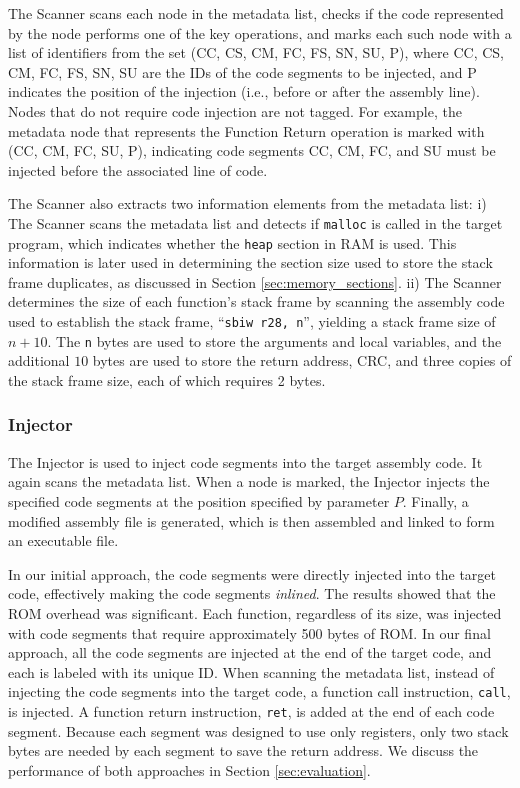 The Scanner scans each node in the metadata list, checks if the code represented by the node performs one of the key operations, and marks each such node with a list of identifiers from the set (CC, CS, CM, FC, FS, SN, SU, P), where CC, CS, CM, FC, FS, SN, SU are the IDs of the code segments to be injected, and P indicates the position of the injection (i.e., before or after the assembly line). Nodes that do not require code injection are not tagged. For example, the metadata node that represents the Function Return operation is marked with (CC, CM, FC, SU, P), indicating code segments CC, CM, FC, and SU must be injected before the associated line of code.

The Scanner also extracts two information elements from the metadata list: i) The Scanner scans the metadata list and detects if \texttt{malloc} is called in the target program, which indicates whether the \texttt{heap} section in RAM is used. This information is later used in determining the section size used to store the stack frame duplicates, as discussed in Section \ref{sec:memory_sections}. ii) The Scanner determines the size of each function's stack frame by scanning the assembly code used to establish the stack frame, ``\texttt{sbiw r28, n}'', yielding a stack frame size of $n + 10$. The \texttt{n} bytes are used to store the arguments and local variables, and the additional $10$ bytes are used to store the return address, CRC, and three copies of the stack frame size, each of which requires 2 bytes.

\subsubsection{Injector}

The Injector is used to inject code segments into the target assembly code. It again scans the metadata list. When a node is marked, the Injector injects the specified code segments at the position specified by parameter $P$. Finally, a modified assembly file is generated, which is then assembled and linked to form an executable file.

In our initial approach, the code segments were directly injected into the target code, effectively making the code segments \textit{inlined}. The results showed that the ROM overhead was significant. Each function, regardless of its size, was injected with code segments that require approximately 500 bytes of ROM. In our final approach, all the code segments are injected at the end of the target code, and each is labeled with its unique ID. When scanning the metadata list, instead of injecting the code segments into the target code, a function call instruction, \texttt{call}, is injected. A function return instruction, \texttt{ret}, is added at the end of each code segment. Because each segment was designed to use only registers, only two stack bytes are needed by each segment to save the return address. We discuss the performance of both approaches in Section \ref{sec:evaluation}.

